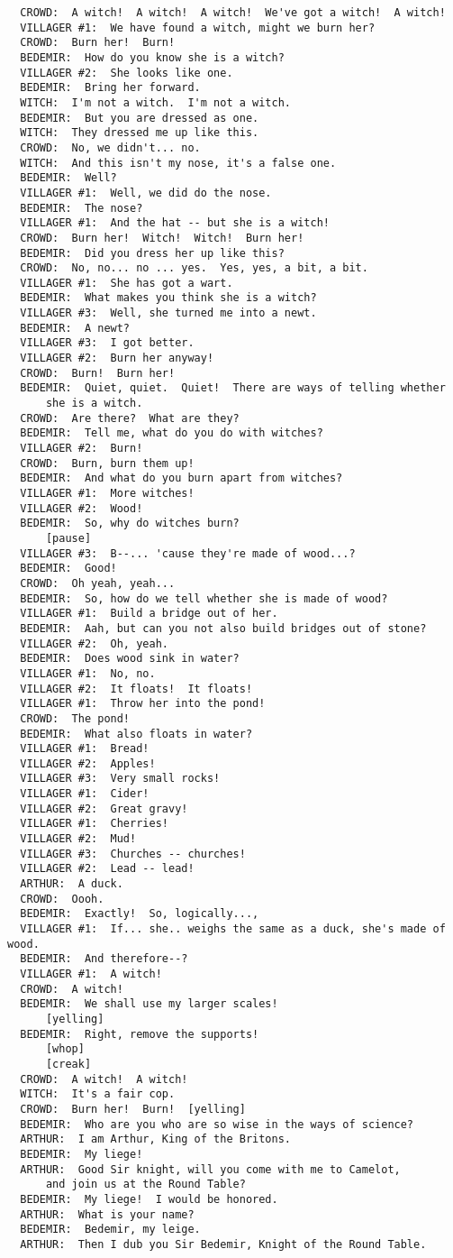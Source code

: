 \documentclass{article}
\begin{document}
\begin{verbatim}
  CROWD:  A witch!  A witch!  A witch!  We've got a witch!  A witch!
  VILLAGER #1:  We have found a witch, might we burn her?
  CROWD:  Burn her!  Burn!
  BEDEMIR:  How do you know she is a witch?
  VILLAGER #2:  She looks like one.
  BEDEMIR:  Bring her forward.
  WITCH:  I'm not a witch.  I'm not a witch.
  BEDEMIR:  But you are dressed as one.
  WITCH:  They dressed me up like this.
  CROWD:  No, we didn't... no.
  WITCH:  And this isn't my nose, it's a false one.
  BEDEMIR:  Well?
  VILLAGER #1:  Well, we did do the nose.
  BEDEMIR:  The nose?
  VILLAGER #1:  And the hat -- but she is a witch!
  CROWD:  Burn her!  Witch!  Witch!  Burn her!
  BEDEMIR:  Did you dress her up like this?
  CROWD:  No, no... no ... yes.  Yes, yes, a bit, a bit.
  VILLAGER #1:  She has got a wart.
  BEDEMIR:  What makes you think she is a witch?
  VILLAGER #3:  Well, she turned me into a newt.
  BEDEMIR:  A newt?
  VILLAGER #3:  I got better.
  VILLAGER #2:  Burn her anyway!
  CROWD:  Burn!  Burn her!
  BEDEMIR:  Quiet, quiet.  Quiet!  There are ways of telling whether
      she is a witch.
  CROWD:  Are there?  What are they?
  BEDEMIR:  Tell me, what do you do with witches?
  VILLAGER #2:  Burn!
  CROWD:  Burn, burn them up!
  BEDEMIR:  And what do you burn apart from witches?
  VILLAGER #1:  More witches!
  VILLAGER #2:  Wood!
  BEDEMIR:  So, why do witches burn?
      [pause]
  VILLAGER #3:  B--... 'cause they're made of wood...?
  BEDEMIR:  Good!
  CROWD:  Oh yeah, yeah...
  BEDEMIR:  So, how do we tell whether she is made of wood?
  VILLAGER #1:  Build a bridge out of her.
  BEDEMIR:  Aah, but can you not also build bridges out of stone?
  VILLAGER #2:  Oh, yeah.
  BEDEMIR:  Does wood sink in water?
  VILLAGER #1:  No, no.
  VILLAGER #2:  It floats!  It floats!
  VILLAGER #1:  Throw her into the pond!
  CROWD:  The pond!
  BEDEMIR:  What also floats in water?
  VILLAGER #1:  Bread!
  VILLAGER #2:  Apples!
  VILLAGER #3:  Very small rocks!
  VILLAGER #1:  Cider!
  VILLAGER #2:  Great gravy!
  VILLAGER #1:  Cherries!
  VILLAGER #2:  Mud!
  VILLAGER #3:  Churches -- churches!
  VILLAGER #2:  Lead -- lead!
  ARTHUR:  A duck.
  CROWD:  Oooh.
  BEDEMIR:  Exactly!  So, logically...,
  VILLAGER #1:  If... she.. weighs the same as a duck, she's made of wood.
  BEDEMIR:  And therefore--?
  VILLAGER #1:  A witch!
  CROWD:  A witch!
  BEDEMIR:  We shall use my larger scales!
      [yelling]
  BEDEMIR:  Right, remove the supports!
      [whop]
      [creak]
  CROWD:  A witch!  A witch!
  WITCH:  It's a fair cop.
  CROWD:  Burn her!  Burn!  [yelling]
  BEDEMIR:  Who are you who are so wise in the ways of science?
  ARTHUR:  I am Arthur, King of the Britons.
  BEDEMIR:  My liege!
  ARTHUR:  Good Sir knight, will you come with me to Camelot,
      and join us at the Round Table?
  BEDEMIR:  My liege!  I would be honored.
  ARTHUR:  What is your name?
  BEDEMIR:  Bedemir, my leige.
  ARTHUR:  Then I dub you Sir Bedemir, Knight of the Round Table.


\end{verbatim}
\end{document}
